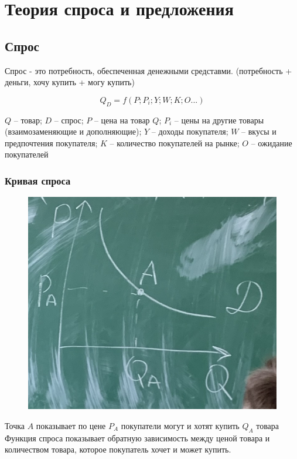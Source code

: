 \section{Теория спроса и предложения}

\subsection{Спрос}

Спрос - это потребность, обеспеченная денежными средставми. (потребность + деньги, хочу купить + могу купить)

\begin{equation}
    Q_D = f(P; P_i; Y; W; K; O...)
\end{equation}

$Q$ -- товар;
$D$ -- спрос;
$P$ -- цена на товар $Q$;
$P_i$ -- цены на другие товары (взаимозаменяющие и дополняющие);
$Y$ -- доходы покупателя;
$W$ -- вкусы и предпочтения покупателя;
$K$ -- количество покупателей на рынке;
$O$ -- ожидание покупателей

\subsubsection{Кривая спроса}

\begin{figure}[H]
    \centering
    \includegraphics[scale=0.1]{img/spros.JPG}
\end{figure}

Точка $A$ показывает по цене $P_A$ покупатели могут и хотят купить $Q_A$ товара
Функция спроса показывает обратную зависимость между ценой товара и количеством товара, которое покупатель хочет и может купить.

